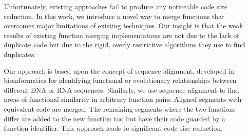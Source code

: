 
Unfortunately, existing approaches fail  to produce any noticeable code size reduction.
In this work, we introduce a novel way to merge functions that overcomes major limitations of existing techniques.
Our insight is that the weak results of existing function merging implementations are not due to the lack of duplicate code but due to the rigid, overly restrictive algorithms they use to find duplicates.


Our approach is based upon the concept of sequence alignment, developed in bioinformatics for identifying functional or evolutionary relationships between different DNA or RNA sequences.
Similarly, we use sequence alignment to find areas of functional similarity in arbitrary function pairs.
Aligned segments with equivalent code are merged.
The remaining segments where the two functions differ are added to the new function too but have their code guarded by a function identifier.
This approach leads to significant code size reduction.

